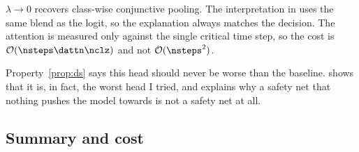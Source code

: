 \begin{property}
\label{prop:ds}
$\lambda \to 0$ recovers class-wise conjunctive pooling. The interpretation in 
uses the same blend as the logit, so the explanation always matches the decision. The attention is
measured only against the single critical time step, so the cost is
$\mathcal{O}(\nsteps \dattn \nclz)$ and not $\mathcal{O}(\nsteps^2)$.
\end{property}

Property~\ref{prop:ds} says this head should never be worse than the baseline. 
shows that it is, in fact, the worst head I tried, and explains why a safety net that nothing pushes
the model towards is not a safety net at all.


\subsection{Summary and cost}
\label{sec:pool:summary}

